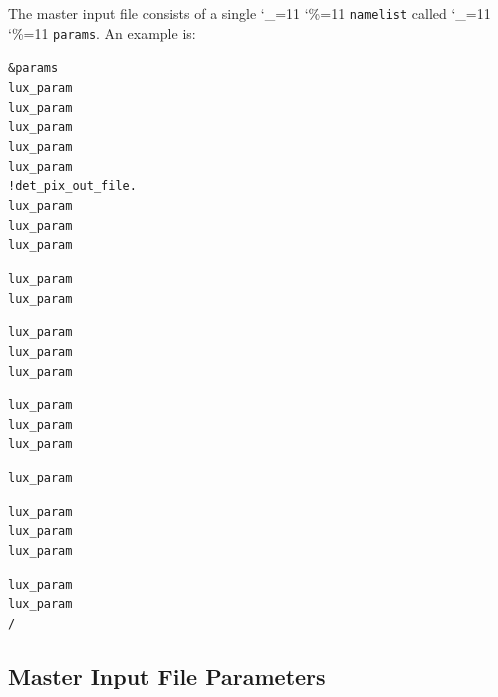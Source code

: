 \documentclass[11pt]{article}
\newcommand\ttcmd{\begingroup\catcode`\_=11 \catcode`\%=11 \dottcmd}
\newcommand\dottcmd[1]{\texttt{#1}\endgroup}
\newcommand{\vn}{\ttcmd}
\newenvironment{example}
  {\vspace{\ExBeg} \begin{alltt}}
  {\end{alltt} \vspace{\ExEnd}}
\newlength{\ExBeg}
\newlength{\ExEnd}
\begin{document}
The master input file consists of a single \vn{namelist} called \vn{params}.
An example is:
\begin{example}
  &params
    lux_param%
    lux_param%
    lux_param%
    lux_param%
    lux_param%
                                                 !             det_pix_out_file.
    lux_param%
    lux_param%
    lux_param%

    lux_param%
    lux_param%

    lux_param%
    lux_param%
    lux_param%

    lux_param%
    lux_param%
    lux_param%

    lux_param%

    lux_param%
    lux_param%
    lux_param%

    lux_param%
    lux_param%
  /
\end{example}

\subsection{Master Input File Parameters}
\label{ss:master.params}
\end{document}
